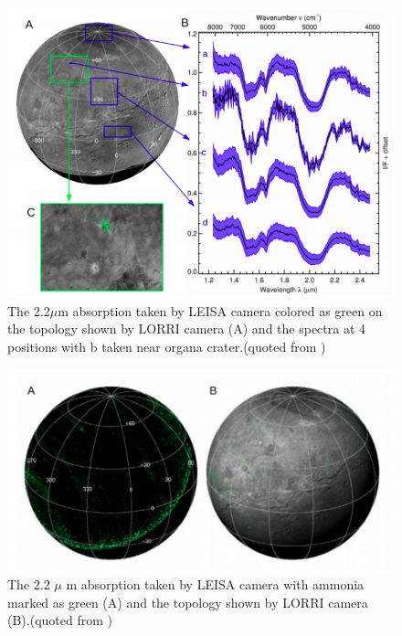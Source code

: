 \begin{figure}
\centering
\includegraphics[width=\textwidth]{figures/chapter1/IR.png}
\caption{The 2.2$\mu$m absorption taken by LEISA camera colored as green on the topology shown by LORRI camera (A) and the spectra at 4 positions with b taken near organa crater.(quoted from \cite{grundy2016surface})}
\label{fig:Charon_IR}
\end{figure}

\begin{figure}
\centering
\includegraphics[width=\textwidth]{figures/chapter1/ammonia.png}
\caption{ The 2.2 $\mu$ m absorption taken by LEISA camera with ammonia marked as green (A) and the topology shown by LORRI camera (B).(quoted from \cite{grundy2016surface})}
\label{fig:Charon_ammonia}
\end{figure}

